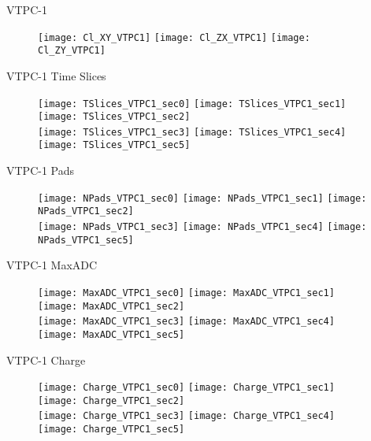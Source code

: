 \documentclass[11pt]{beamer}
\begin{document}
\begin{frame}{VTPC-1}
\begin{figure}
\centering
\texttt{[image: Cl\_XY\_VTPC1]}
\texttt{[image: Cl\_ZX\_VTPC1]}
\texttt{[image: Cl\_ZY\_VTPC1]}
\end{figure}
\end{frame}

\begin{frame}{VTPC-1 Time Slices}
\begin{figure}
\centering
\texttt{[image: TSlices\_VTPC1\_sec0]}
\texttt{[image: TSlices\_VTPC1\_sec1]}
\texttt{[image: TSlices\_VTPC1\_sec2]}\\
\texttt{[image: TSlices\_VTPC1\_sec3]}
\texttt{[image: TSlices\_VTPC1\_sec4]}
\texttt{[image: TSlices\_VTPC1\_sec5]}
\end{figure}
\end{frame}

\begin{frame}{VTPC-1 Pads}
\begin{figure}
\centering
\texttt{[image: NPads\_VTPC1\_sec0]}
\texttt{[image: NPads\_VTPC1\_sec1]}
\texttt{[image: NPads\_VTPC1\_sec2]}\\
\texttt{[image: NPads\_VTPC1\_sec3]}
\texttt{[image: NPads\_VTPC1\_sec4]}
\texttt{[image: NPads\_VTPC1\_sec5]}
\end{figure}
\end{frame}

\begin{frame}{VTPC-1 MaxADC}
\begin{figure}
\centering
\texttt{[image: MaxADC\_VTPC1\_sec0]}
\texttt{[image: MaxADC\_VTPC1\_sec1]}
\texttt{[image: MaxADC\_VTPC1\_sec2]}\\
\texttt{[image: MaxADC\_VTPC1\_sec3]}
\texttt{[image: MaxADC\_VTPC1\_sec4]}
\texttt{[image: MaxADC\_VTPC1\_sec5]}
\end{figure}
\end{frame}

\begin{frame}{VTPC-1 Charge}
\begin{figure}
\centering
\texttt{[image: Charge\_VTPC1\_sec0]}
\texttt{[image: Charge\_VTPC1\_sec1]}
\texttt{[image: Charge\_VTPC1\_sec2]}\\
\texttt{[image: Charge\_VTPC1\_sec3]}
\texttt{[image: Charge\_VTPC1\_sec4]}
\texttt{[image: Charge\_VTPC1\_sec5]}
\end{figure}
\end{frame}
\end{document}

